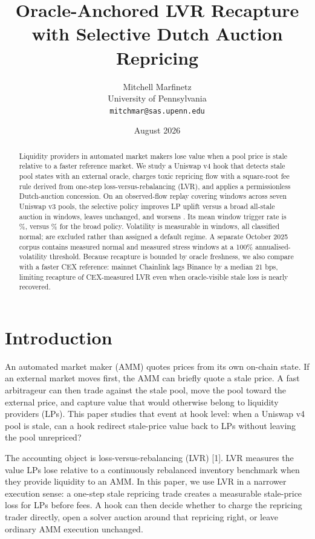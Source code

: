 \documentclass[11pt]{article}
\title{Oracle-Anchored LVR Recapture with Selective Dutch Auction Repricing}
\author{
Mitchell Marfinetz\\
University of Pennsylvania\\
\texttt{mitchmar@sas.upenn.edu}
}
\date{August 2026}
\begin{document}
\maketitle

\begin{abstract}
Liquidity providers in automated market makers lose value when a pool price is stale relative to a faster reference market. We study a Uniswap v4 hook that detects stale pool states with an external oracle, charges toxic repricing flow with a square-root fee rule derived from one-step loss-versus-rebalancing (LVR), and applies a permissionless Dutch-auction concession. On an observed-flow replay covering \EvidenceAblationWindows{} windows across seven Uniswap v3 pools, the selective policy improves LP uplift versus a broad all-stale auction in \EvidenceAblationImproved{} windows, leaves \EvidenceAblationUnchanged{} unchanged, and worsens \EvidenceAblationWorsened{}. Its mean window trigger rate is \EvidenceSelectiveTriggerPct\%, versus \EvidenceBroadTriggerPct\% for the broad policy. Volatility is measurable in \EvidenceMeasuredAblationWindows{} windows, all classified normal; \EvidenceUnmeasurableAblationWindows{} are excluded rather than assigned a default regime. A separate October 2025 corpus contains \EvidenceOctoberNormal{} measured normal and \EvidenceOctoberStress{} measured stress windows at a 100\% annualised-volatility threshold. Because recapture is bounded by oracle freshness, we also compare with a faster CEX reference: mainnet Chainlink lags Binance by a median 21 bps, limiting recapture of CEX-measured LVR even when oracle-visible stale loss is nearly recovered.\end{abstract}

\section{Introduction}
An automated market maker (AMM) quotes prices from its own on-chain state. If an external market moves first, the AMM can briefly quote a stale price. A fast arbitrageur can then trade against the stale pool, move the pool toward the external price, and capture value that would otherwise belong to liquidity providers (LPs). This paper studies that event at hook level: when a Uniswap v4 pool is stale, can a hook redirect stale-price value back to LPs without leaving the pool unrepriced?

The accounting object is loss-versus-rebalancing (LVR) [1]. LVR measures the value LPs lose relative to a continuously rebalanced inventory benchmark when they provide liquidity to an AMM. In this paper, we use LVR in a narrower execution sense: a one-step stale repricing trade creates a measurable stale-price loss for LPs before fees. A hook can then decide whether to charge the repricing trader directly, open a solver auction around that repricing right, or leave ordinary AMM execution unchanged.
\end{document}
